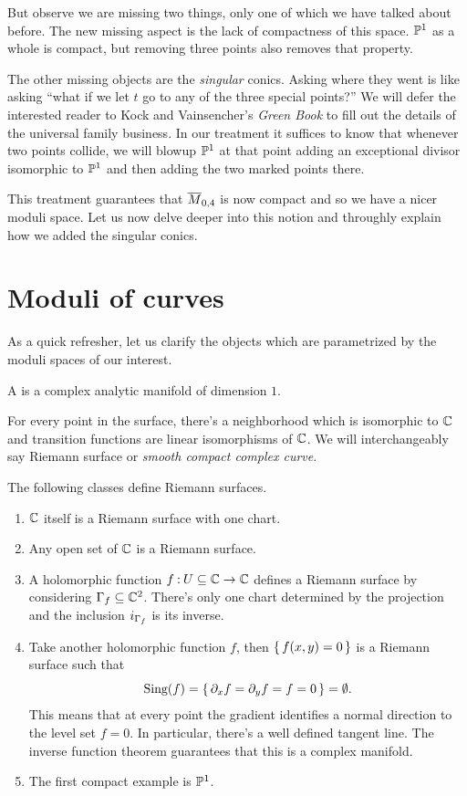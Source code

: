 \documentclass[12pt]{memoir}
\begin{document}
 But observe we are missing two things, only one of which we have talked about before. The new missing aspect is the lack of compactness of this space. $\mathbb{P}^1$ as a whole is compact, but removing three points also removes that property.\par
 The other missing objects are the \emph{singular} conics. Asking where they went is like asking ``what if we let $t$ go to any of the three special points?'' We will defer the interested reader to Kock and Vainsencher's \emph{Green Book} \cite{GreenBookKockVainsencher} to fill out the details of the universal family business. In our treatment it suffices to know that whenever two points collide, we will blowup $\mathbb{P}^1$ at that point adding an exceptional divisor isomorphic to $\mathbb{P}^1$ and then adding the two marked points there.\par
 This treatment guarantees that $\overline M_{0,4}$ is now compact and so we have a nicer moduli space. Let us now delve deeper into this notion and throughly explain how we added the singular conics.


\section{Moduli of curves}

As a quick refresher, let us clarify the objects which are parametrized by the moduli spaces of our interest. 

\begin{Def}
    A  is a complex analytic manifold of dimension $1$. 
\end{Def}

For every point in the surface, there's a neighborhood which is isomorphic to $\mathbb{C}$ and transition functions are linear isomorphisms of $\mathbb{C}$. We will interchangeably say Riemann surface or \emph{smooth compact complex curve}.
    
\begin{Ex}
        The following classes define Riemann surfaces.
        \begin{enumerate}
        \item $\mathbb{C}$ itself is a Riemann surface with one chart.
        \item Any open set of $\mathbb{C}$ is a Riemann surface.
        \item A holomorphic function $f\mathbin{:} U\subseteq\mathbb{C}\to\mathbb{C}$ defines a Riemann surface by considering $\Gamma_f\subseteq\mathbb{C}^2$. There's only one chart determined by the projection and the inclusion $i_{\Gamma_f}$ is its inverse.
        \item Take another holomorphic function $f$, then $\{\,f(x,y)=0\,\}$ is a Riemann surface such that 
        $$\text{Sing}(f)=\{\,\partial_xf=\partial_yf=f=0\,\}=\emptyset.$$
        This means that at every point the gradient identifies a normal direction to the level set $f=0$. In particular, there's a well defined tangent line. The inverse function theorem guarantees that this is a complex manifold. 
        \item The first compact example is $\mathbb{P}^1$.
        \end{enumerate}
\end{Ex} 
\end{document}
